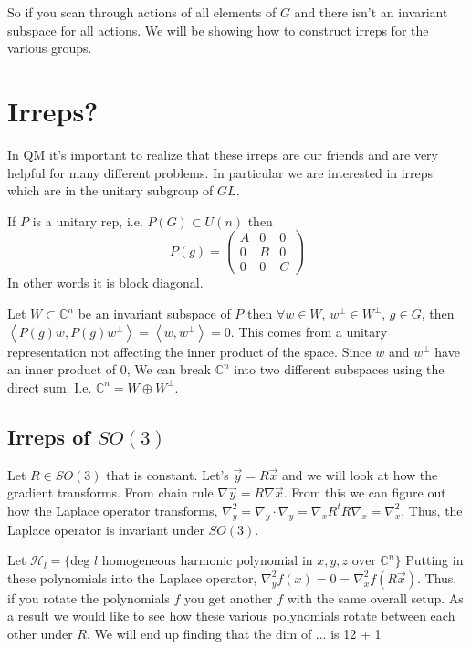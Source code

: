So if you scan through actions of all elements of $G$ and there isn't an
invariant subspace for all actions.
We will be showing how to construct irreps for the various groups. 

\section{Irreps?}
In QM it's important to realize that these irreps are our friends and are very helpful
for many different problems. In particular we are interested in irreps
which are in the unitary subgroup of $GL$.

If $P$ is a unitary rep, i.e. $P(G) \subset U(n)$ then
$$
    P(g) =
    \begin{pmatrix}
        A & 0 & 0 \\
        0 & B & 0 \\
        0 & 0 & C
    \end{pmatrix}
$$
In other words it is block diagonal.

Let $W \subset \mathbb{C}^n$ be an invariant subspace of $P$
then $\forall w \in W$, $w^\perp \in W^\perp$, $g \in G$, then
$\left<P(g) w, P(g) w^\perp\right> = \left<w, w^\perp\right> = 0$.
This comes from a unitary representation not affecting the 
inner product of the space. Since $w$ and $w^\perp$ have an inner product
of $0$, We can break $\mathbb{C}^n$ into two different subspaces using the
direct sum. I.e. $\mathbb{C}^n = W \oplus W^\perp$.


\subsection{Irreps of $SO(3)$}
Let $R \in SO(3)$ that is constant. Let's $\vec{y} = R \vec{x}$ and we will look
at how the gradient transforms. From chain rule $\nabla \vec{y} = R \nabla\vec{x}$.
From this we can figure out how the Laplace operator transforms,
$\nabla^2_y = \nabla_y \cdot \nabla_y = \nabla_x R^t R \nabla_x = \nabla^2_x$.
Thus, the Laplace operator is invariant under $SO(3)$.

Let $\mathcal{H}_l = \{ \text{deg } l \text{ homogeneous harmonic polynomial in } x, y, z
\text{ over } \mathbb{C}^n\}$
Putting in these polynomials into the Laplace operator,
$\nabla^2_y f(x) = 0 = \nabla_x^2 f(R \vec{x})$. Thus, if you
rotate the polynomials $f$ you get another $f$ with the same
overall setup. As a result we would like to see how these various polynomials
rotate between each other under $R$. We will end up finding that the dim of
... is 12 + 1

